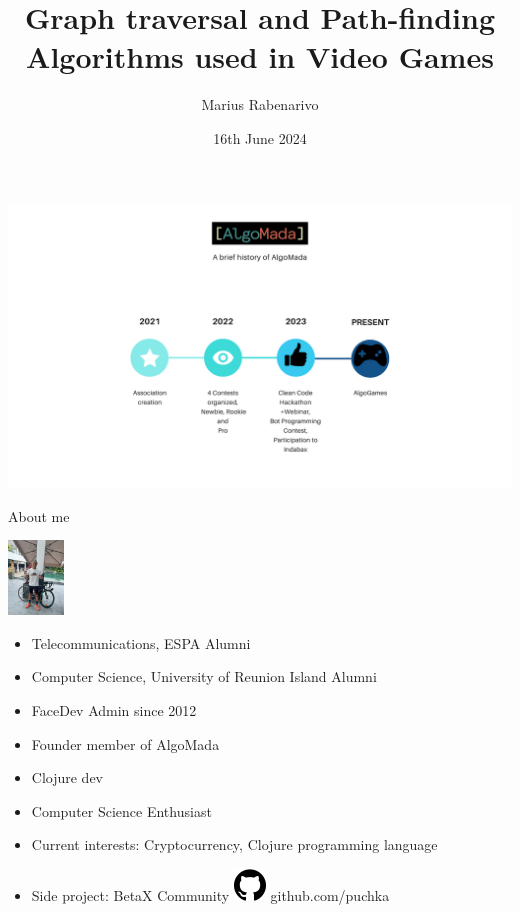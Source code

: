 \documentclass[ignorenonframetext,]{beamer}
\title{Graph traversal and Path-finding Algorithms used in Video Games}
\author{Marius Rabenarivo}
\date{16th June 2024}
\providecommand{\tightlist}{%
  \setlength{\itemsep}{0pt}\setlength{\parskip}{0pt}}
\begin{document}
\frame{\titlepage}

\begin{frame}

\includegraphics{AlgoMada.png}

\end{frame}

\begin{frame}{About me}
\protect\hypertarget{about-me}{}

\includegraphics[width=\textwidth,height=0.78125in]{marius.jpg}

\begin{itemize}
\tightlist
\item
  Telecommunications, ESPA Alumni
\item
  Computer Science, University of Reunion Island Alumni
\item
  FaceDev Admin since 2012
\item
  Founder member of AlgoMada
\item
  Clojure dev
\item
  Computer Science Enthusiast
\item
  Current interests: Cryptocurrency, Clojure programming language
\item
  Side project: BetaX Community
  \includegraphics[width=\textwidth,height=0.33333in]{github-logo.png}
  github.com/puchka
\end{itemize}

\end{frame}
\end{document}
